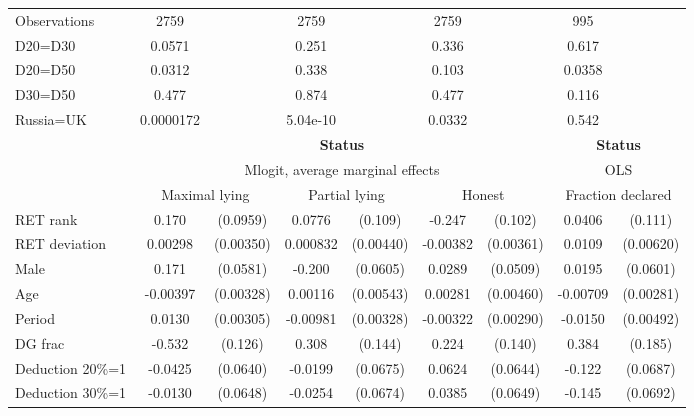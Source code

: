 \begin{tabular}{l|cccccc|cc}
\hline
Observations    &     2759         &         &     2759         &         &     2759         &         &      995         &         \\
D20=D30         &   0.0571         &         &    0.251         &         &    0.336         &         &    0.617         &         \\
D20=D50         &   0.0312         &         &    0.338         &         &    0.103         &         &   0.0358         &         \\
D30=D50         &    0.477         &         &    0.874         &         &    0.477         &         &    0.116         &         \\
Russia=UK       &0.0000172         &         & 5.04e-10         &         &   0.0332         &         &    0.542         &         \\
\hline\hline
&\multicolumn{6}{c|}{\bf Status}&\multicolumn{2}{c}{\bf Status}\\ &\multicolumn{6}{c|}{Mlogit, average marginal effects }&\multicolumn{2}{c}{OLS}\\
                &\multicolumn{2}{c}{Maximal lying}&\multicolumn{2}{c}{Partial lying}&\multicolumn{2}{c}{Honest}  &\multicolumn{2}{c}{Fraction declared}\\
\hline
RET rank        &    0.170\sym{*}  & (0.0959)&   0.0776         &  (0.109)&   -0.247\sym{**} &  (0.102)&   0.0406         &  (0.111)\\
RET deviation   &  0.00298         &(0.00350)& 0.000832         &(0.00440)& -0.00382         &(0.00361)&   0.0109\sym{*}  &(0.00620)\\
Male            &    0.171\sym{***}& (0.0581)&   -0.200\sym{***}& (0.0605)&   0.0289         & (0.0509)&   0.0195         & (0.0601)\\
Age             & -0.00397         &(0.00328)&  0.00116         &(0.00543)&  0.00281         &(0.00460)& -0.00709\sym{**} &(0.00281)\\
Period          &   0.0130\sym{***}&(0.00305)& -0.00981\sym{***}&(0.00328)& -0.00322         &(0.00290)&  -0.0150\sym{***}&(0.00492)\\
DG frac         &   -0.532\sym{***}&  (0.126)&    0.308\sym{**} &  (0.144)&    0.224         &  (0.140)&    0.384\sym{**} &  (0.185)\\
Deduction 20\%=1&  -0.0425         & (0.0640)&  -0.0199         & (0.0675)&   0.0624         & (0.0644)&   -0.122\sym{*}  & (0.0687)\\
Deduction 30\%=1&  -0.0130         & (0.0648)&  -0.0254         & (0.0674)&   0.0385         & (0.0649)&   -0.145\sym{**} & (0.0692)\\

\end{tabular}
